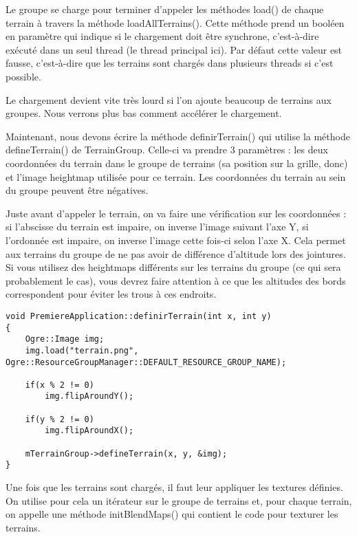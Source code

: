 Le groupe se charge pour terminer d'appeler les m\'ethodes load() de chaque terrain \`a travers la m\'ethode loadAllTerrains(). Cette m\'ethode prend un bool\'een en param\`etre qui indique si le chargement doit \^etre synchrone, c'est-\`a-dire ex\'ecut\'e dans un seul thread (le thread principal ici). Par d\'efaut cette valeur est fausse, c'est-\`a-dire que les terrains sont charg\'es dans plusieurs threads si c'est possible.

Le chargement devient vite tr\`es lourd si l'on ajoute beaucoup de terrains aux groupes. Nous verrons plus bas comment acc\'el\'erer le chargement.

Maintenant, nous devons \'ecrire la m\'ethode definirTerrain() qui utilise la m\'ethode defineTerrain() de TerrainGroup. Celle-ci va prendre 3 param\`etres : les deux coordonn\'ees du terrain dans le groupe de terrains (sa position sur la grille, donc) et l'image heightmap utilis\'ee pour ce terrain. Les coordonn\'ees du terrain au sein du groupe peuvent \^etre n\'egatives.

Juste avant d'appeler le terrain, on va faire une v\'erification sur les coordonn\'ees : si l'abscisse du terrain est impaire, on inverse l'image suivant l'axe Y, si l'ordonn\'ee est impaire, on inverse l'image cette fois-ci selon l'axe X. Cela permet aux terrains du groupe de ne pas avoir de diff\'erence d'altitude lors des jointures. Si vous utilisez des heightmaps diff\'erents sur les terrains du groupe (ce qui sera probablement le cas), vous devrez faire attention \`a ce que les altitudes des bords correspondent pour \'eviter les trous \`a ces endroits.

\begin{lstlisting}[caption={PremiereApplication.definirTerrain}]
void PremiereApplication::definirTerrain(int x, int y)
{
    Ogre::Image img;
    img.load("terrain.png", Ogre::ResourceGroupManager::DEFAULT_RESOURCE_GROUP_NAME);

    if(x % 2 != 0)
        img.flipAroundY();

    if(y % 2 != 0)
        img.flipAroundX();

    mTerrainGroup->defineTerrain(x, y, &img);
}
\end{lstlisting}

Une fois que les terrains sont charg\'es, il faut leur appliquer les textures d\'efinies. On utilise pour cela un it\'erateur sur le groupe de terrains et, pour chaque terrain, on appelle une m\'ethode initBlendMaps() qui contient le code pour texturer les terrains.

